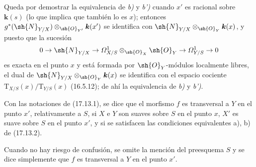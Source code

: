 Queda por demostrar la equivalencia de \emph{b)} y \emph{b')} cuando $x'$ es racional sobre $\boldsymbol{k}(s)$ (lo que implica que también lo es $x$); entonces $g^*(\sh{N}_{Y/X})\otimes_{\sh{O}_{Y'}}\boldsymbol{k}(x')$ se identifica con $\sh{N}_{Y/X}\otimes_{\sh{O}_Y}\boldsymbol{k}(x)$, y puesto que la sucesión
\[
0\to\sh{N}_{Y/X}\to\varOmega^1_{X/S}\otimes_{\sh{O}_X}\sh{O}_Y\to\varOmega^1_{Y/S}\to0
\]
es exacta en el punto $x$ y está formada por $\sh{O}_Y$-módulos localmente libres, el dual de $\sh{N}_{Y/X}\otimes_{\sh{O}_Y}\boldsymbol{k}(x)$ se identifica con el espacio cociente $\mathrm{T}_{X/S}(x)/\mathrm{T}_{Y/S}(x)$ (16.5.12); de ahí la equivalencia de \emph{b)} y \emph{b')}.

\begin{definition}[17.13.3]
\label{IV.17.13.3}
Con las notaciones de \textup{(17.13.1)}, se dice que el morfismo $f$ es transversal a $Y$ en el punto $x'$, relativamente a $S$, si $X$ e $Y$ son suaves sobre $S$ en el punto $x$, $X'$ es suave sobre $S$ en el punto $x'$, y si se satisfacen las condiciones equivalentes \textup{a), b)} de \textup{(17.13.2)}.
\end{definition}

Cuando no hay riesgo de confusión, se omite la mención del preesquema $S$ y se dice simplemente que $f$ es transversal a $Y$ en el punto $x'$.

